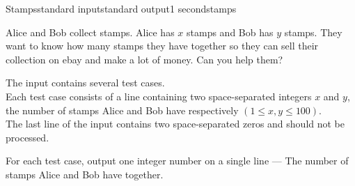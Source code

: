 \begin{problem}{Stamps}{standard input}{standard output}{1 second}{stamps}

Alice and Bob collect stamps. Alice has $x$ stamps and Bob has $y$ stamps. They want to know how many stamps they have together so they can sell their collection on ebay and make a lot of money. Can you help them?

\InputFile

The input contains several test cases.\\
Each test case consists of a line containing two space-separated integers $x$ and $y$, the number of stamps Alice and Bob have respectively $(1 \leq x, y \leq 100)$.\\
The last line of the input contains two space-separated zeros and should not be processed.

\OutputFile

For each test case, output one integer number on a single line --- The number of stamps Alice and Bob have together.

\Example

\begin{example}
%
\end{example}

\end{problem}

